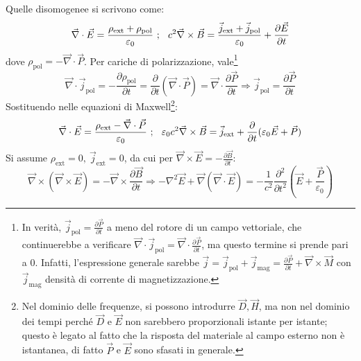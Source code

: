 \documentclass[10pt, a4paper]{scrartcl}
\numberwithin{equation}{subsection}
\theoremstyle{style1}
\begin{document}
Quelle disomogenee si scrivono come:
\begin{equation}
		 \vec{\nabla }\cdot \vec{E}= \frac{\rho _\text{ext}+ \rho _\text{pol}}{\varepsilon _0}\ ;\hspace{.25cm} c^2 \vec{\nabla }\times \vec{B}= \frac{\vec{j}_\text{ext}+ \vec{j}_\text{pol}}{\varepsilon _0} + \frac{\partial \vec{E}}{\partial t} 
\end{equation}
dove $\rho _\text{pol}=-\vec{\nabla }\cdot \vec{P}$. Per cariche di polarizzazione, vale\footnote{In verit\`a, $\vec{j}_\text{pol}=\frac{\partial \vec{P}}{\partial t} $ a meno del rotore di un campo vettoriale, che continuerebbe a verificare $\vec{\nabla }\cdot \vec{j}_\text{pol}= \vec{\nabla }\cdot \frac{\partial \vec{P}}{\partial t} $, ma questo termine si prende pari a $0$. Infatti, l'espressione generale sarebbe $\vec{j}= \vec{j}_\text{pol}+\vec{j}_\text{mag}=\frac{\partial \vec{P}}{\partial t} +\vec{\nabla }\times \vec{M}$ con $\vec{j}_\text{mag}$ densit\`a di corrente di magnetizzazione.}
\begin{equation}
		\vec{\nabla }\cdot \vec{j}_\text{pol}= - \frac{\partial \rho _\text{pol}}{\partial t}= \frac{\partial }{\partial t} (\vec{\nabla }\cdot \vec{P}) = \vec{\nabla }\cdot \frac{\partial \vec{P}}{\partial t} \Rightarrow \vec{j}_\text{pol}= \frac{\partial \vec{P}}{\partial t} 
\end{equation}
Sostituendo nelle equazioni di Maxwell\footnote{Nel dominio delle frequenze, si possono introdurre $\vec{D}, \vec{H}$, ma non nel dominio dei tempi perch\'e $\vec{D}$ e $\vec{E}$ non sarebbero proporzionali istante per istante; questo \`e legato al fatto che la risposta del materiale al campo esterno non \`e istantanea, di fatto $\vec{P}$ e $\vec{E}$ sono sfasati in generale.}:
\begin{equation}
	\vec{\nabla }\cdot \vec{E}=\frac{\rho _\text{ext}-\vec{\nabla }\cdot \vec{P}}{\varepsilon _0}\ ;\hspace{.25cm} \varepsilon _0 c^2 \vec{\nabla }\times  \vec{B}= \vec{j}_\text{ext}+ \frac{\partial }{\partial t} (\varepsilon _0 \vec{E}+\vec{P})
\end{equation}
Si assume $\rho _\text{ext}=0, \ \vec{j}_\text{ext}=0$, da cui per $\vec{\nabla }\times \vec{E}= - \frac{\partial \vec{B}}{\partial t} $:
\begin{equation}
	\vec{\nabla }\times (\vec{\nabla }\times \vec{E}) = - \vec{\nabla }\times \frac{\partial \vec{B}}{\partial t} \Rightarrow -\nabla ^2 \vec{E}+\vec{\nabla }(\vec{\nabla }\cdot \vec{E}) = - \frac{1}{c^2} \frac{\partial^2 }{\partial t^2} \left(\vec{E}+\frac{\vec{P}}{\varepsilon _0}\right) 
\end{equation}
\end{document}
